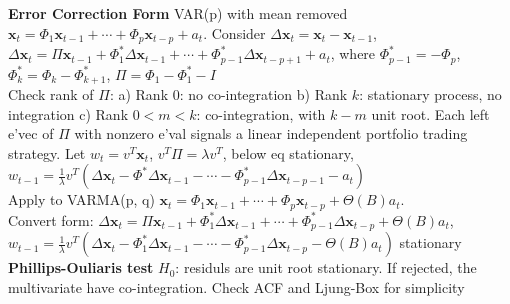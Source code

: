 \documentclass[10pt,landscape, a4paper]{article}
\theoremstyle{remark}
\begin{document}
\begin{multicols*}{3}
\textbf{Error Correction Form} VAR(p) with mean removed $\bm{x}_t = \Phi_1 \bm{x}_{t-1} + \cdots + \Phi_p \bm{x}_{t-p} + a_t$. Consider $\Delta \bm{x}_t = \bm{x}_t - \bm{x}_{t-1}$, $\Delta \bm{x}_t = \Pi \bm{x}_{t-1} + \Phi^{*}_{1}\Delta \bm{x}_{t-1} + \cdots + \Phi^{*}_{p-1} \Delta \bm{x}_{t-p+1} + a_t $, where $\Phi^{*}_{p-1} =-\Phi_p $, $\Phi^{*}_{k} = \Phi_k - \Phi^{*}_{k+1} $, $\Pi = \Phi_1 - \Phi^{*}_{1} - I $\\
Check rank of $\Pi$: a) Rank $0$: no co-integration b) Rank $k$: stationary process, no integration c) Rank $0<m<k$: co-integration, with $k-m$ unit root. Each left e'vec of $\Pi$ with nonzero e'val signals a linear independent portfolio trading strategy. Let $w_t = v^T \bm{x}_t$, $v^T \Pi =\lambda v^T$, below eq stationary,
$w_{t-1} =\frac{1}{\lambda} v^T (\Delta \bm{x}_t - \Phi^{*} \Delta \bm{x}_{t-1}- \cdots - \Phi^{*}_{p-1} \Delta \bm{x}_{t-p-1} -a_t) $\\
Apply to VARMA(p, q) $\bm{x}_t = \Phi_1 \bm{x}_{t-1} + \cdots + \Phi_p \bm{x}_{t-p} + \Theta(B)a_t $.\\ 
Convert form: $\Delta \bm{x}_t = \Pi \bm{x}_{t-1} + \Phi^*_{1} \Delta \bm{x}_{t-1} +\cdots + \Phi^*_{p-1} \Delta \bm{x}_{t-p} +\Theta (B) a_t $,\\
$w_{t-1} =\frac{1}{\lambda} v^T(\Delta \bm{x}_t -\Phi^*_{1}\Delta\bm{x}_{t-1} - \cdots - \Phi^*_{p-1} \Delta \bm{x}_{t-p} -\Theta(B) a_t ) $ stationary\\

\textbf{Phillips-Ouliaris test} $H_0$: residuls are unit root stationary. If rejected, the multivariate have co-integration. Check ACF and Ljung-Box for simplicity
 
\end{multicols*}
\end{document}
